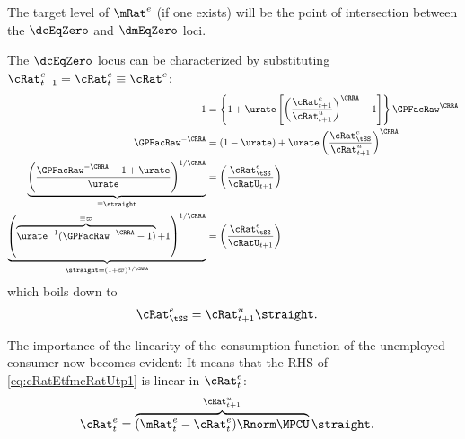 \documentclass{\handout}
\begin{document}
The target level of $\mRat^{e}$ (if one exists) will be the point of intersection between the $\dcEqZero$ and $\dmEqZero$ loci.  

The $\dcEqZero$ locus can be characterized by substituting ${\cRat}^{e}_{t+1}={\cRat}^{e}_{t} \equiv {\cRat}^{e}$:
\begin{equation}\begin{gathered}\begin{aligned}
         1 & = \left\{1+\urate\left[\left(\frac{{\cRat}^{e}_{t+1}}{\cRat_{t+1}^{u}}\right)^{\CRRA}-1\right]\right\} \GPFacRaw^{\CRRA}  \notag
\\ \GPFacRaw^{-\CRRA} & =  (1-\urate)+\urate\left(\frac{{\cRat}^{e}_{\tSS}}{\cRat_{t+1}^{u} }\right)^{\CRRA} \notag
\\ \underbrace{\left(\frac{\GPFacRaw^{-\CRRA}-1+\urate}{\urate}\right)^{1/\CRRA}}_{\equiv \straight} & =   \left(\frac{{\cRat}^{e}_{\tSS}}{\cRatU_{t+1}}\right) \label{eq:straightDef}
  \\ \underbrace{\left(\overbrace{\urate^{-1}(\GPFacRaw^{-\CRRA}-1)}^{\equiv \varpi}+1\right)^{1/\CRRA}}_{\straight=(1+\varpi)^{1/\CRRA}} & =   \left(\frac{{\cRat}^{e}_{\tSS}}{\cRatU_{t+1}}\right) \notag %
\end{aligned}\end{gathered}\end{equation}
which boils down to 
\begin{equation}\begin{gathered}\begin{aligned}
     {\cRat}^{e}_{\tSS} & = \cRat^{u}_{t+1} \straight \label{eq:cRatEtfmcRatUtp1}.
\end{aligned}\end{gathered}\end{equation}


The importance of the linearity of the consumption function of the unemployed consumer now becomes evident:  It means that the RHS of \eqref{eq:cRatEtfmcRatUtp1} is linear in $\cRat^{e}_{t}$:
\begin{equation}\begin{gathered}\begin{aligned}
  \cRat^{e}_{t} & =  \overbrace{(\mRat^{e}_{t}-{\cRat}^{e}_{t})\Rnorm \MPCU}^{\cRat^{u}_{t+1}} \straight \label{eq:PSTerm}.
\end{aligned}\end{gathered}\end{equation}
\end{document}
